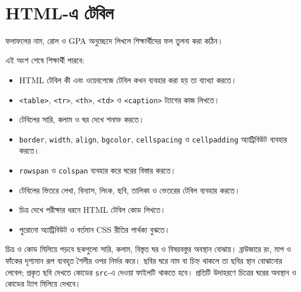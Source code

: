 ﻿%

\section{HTML-এ টেবিল}

ফলাফলের নাম, রোল ও GPA অনুচ্ছেদে লিখলে শিক্ষার্থীদের ফল তুলনা করা কঠিন।



\begin{learningbox}
এই অংশ শেষে শিক্ষার্থী পারবে:
\begin{itemize}
\item HTML টেবিল কী এবং ওয়েবপেজে টেবিল কখন ব্যবহার করা হয় তা ব্যাখ্যা করতে।
\item \texttt{<table>}, \texttt{<tr>}, \texttt{<th>}, \texttt{<td>} ও \texttt{<caption>} ট্যাগের কাজ লিখতে।
\item টেবিলের সারি, কলাম ও ঘর দেখে শনাক্ত করতে।
\item \texttt{border}, \texttt{width}, \texttt{align}, \texttt{bgcolor}, \texttt{cellspacing} ও \texttt{cellpadding} অ্যাট্রিবিউট ব্যবহার করতে।
\item \texttt{rowspan} ও \texttt{colspan} ব্যবহার করে ঘরের বিস্তার করতে।
\item টেবিলের ভিতরে লেখা, বিন্যাস, লিংক, ছবি, তালিকা ও ভেতরের টেবিল ব্যবহার করতে।
\item চিত্র দেখে পরীক্ষার ধরনে HTML টেবিল কোড লিখতে।
\item পুরোনো অ্যাট্রিবিউট ও বর্তমান CSS রীতির পার্থক্য বুঝতে।
\end{itemize}
\end{learningbox}



\begin{keypointbox}{চিত্র ও কোড মিলিয়ে পড়বে}
ছকগুলো সারি, কলাম, বিস্তৃত ঘর ও বিষয়বস্তুর অবস্থান বোঝায়। ব্রাউজারে রং, মাপ ও ফাঁকের দৃশ্যমান রূপ ব্যবহৃত শৈলীর ওপর নির্ভর করে। ছবির ঘরে নাম বা চিহ্ন থাকলে তা ছবির স্থান বোঝানোর লেবেল; প্রকৃত ছবি দেখতে কোডের \texttt{src}-এ দেওয়া ফাইলটি থাকতে হবে। প্রতিটি উদাহরণে চিত্রের ঘরের অবস্থান ও কোডের ট্যাগ মিলিয়ে দেখবে।
\end{keypointbox}

